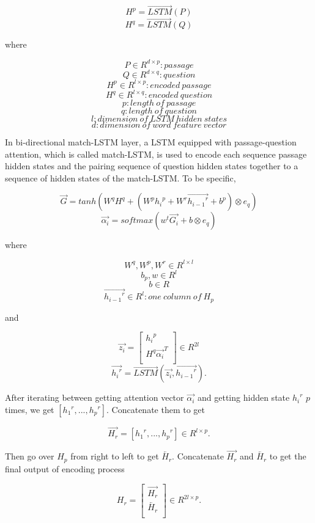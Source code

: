 \documentclass[modernstyle,12pt]{sjsuthesis}
\theoremstyle{definition}
\begin{document}
$$H^p = \overrightarrow{LSTM}(P)$$
$$H^q = \overrightarrow{LSTM}(Q)$$

where

 $$P\in R^{d \times p}: passage$$
 $$Q\in R^{d \times q}: question$$
 $$H^p\in R^{l \times p}: encoded\ passage$$
 $$H^q\in R^{l \times q}: encoded\ question$$
 $$p: length \ of\ passage$$
 $$q: length\ of\ question$$
 $$l: dimension\ of\ LSTM\ hidden\ states$$
 $$d: dimension\ of\ word\ feature\ vector$$

In bi-directional match-LSTM layer, a LSTM equipped with passage-question attention, which is called match-LSTM, is used to encode each sequence passage hidden states and the pairing sequence of question hidden states together to a sequence of hidden states of the match-LSTM. To be specific,

$$\overrightarrow{G} = tanh(W^qH^q + (W^p{h_i}^p + W^r\overrightarrow{{h_{i-1}}^r} + b^p) \otimes e_q)$$
$$\overrightarrow{\alpha _i} = softmax(w^t\overrightarrow{G_i} + b \otimes e_q)$$


where

$$W^q, W^p, W^r\in R^{l \times l} $$
$$b_p, w\in R^{l}  $$
$$b \in R $$
$$\overrightarrow{{h_{i-1}}^r}\in R^{l}: one\ column\ of\ H_p  $$

and

\[ \overrightarrow{z_i} =
\begin{bmatrix}
{h_i}^p \\
H^q\overrightarrow{ {\alpha _i}}^T \\
\end{bmatrix}
\in R^{2l}
\]
$$\overrightarrow{{h_i}^r} = \overrightarrow{LSTM}(\overrightarrow{z_i}, \overrightarrow{{h_{i-1}}^r}).$$

After iterating between getting attention vector $\overrightarrow{\alpha _i}$ and getting hidden state ${{h_{i}}^r}$ $p$ times, we get $[{{h_{1}}^r}, ..., {{h_{p}}^r}]$. Concatenate them to get

$$\overrightarrow{H_r} = [{{h_{1}}^r}, ..., {{h_{p}}^r}] \in R^{l \times p}.$$

Then go over $H_p$ from right to left to get $\overleftarrow{H_r}$. Concatenate $\overrightarrow{H_r}$ and $\overleftarrow{H_r}$ to get the final output of encoding process

\[ H_r =
\begin{bmatrix}
\overrightarrow{H_r} \\
\overleftarrow{H_r} \\
\end{bmatrix}
\in R^{2l \times p}.
\]
\end{document}

